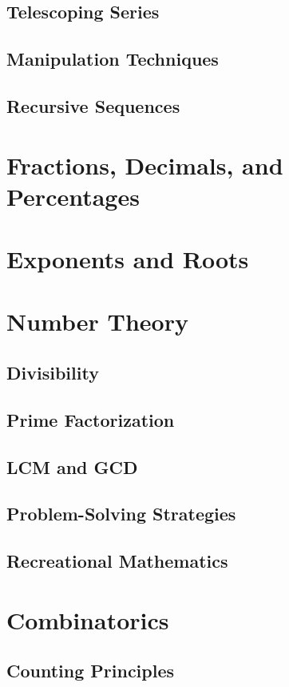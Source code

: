 \subsection{Telescoping Series}
\subsection{Manipulation Techniques}
\subsection{Recursive Sequences}

\section{Fractions, Decimals, and Percentages}

\section{Exponents and Roots}

\section{Number Theory}
\subsection{Divisibility}
\subsection{Prime Factorization}
\subsection{LCM and GCD}
\subsection{Problem-Solving Strategies}
\subsection{Recreational Mathematics}

\section{Combinatorics}
\subsection{Counting Principles}
